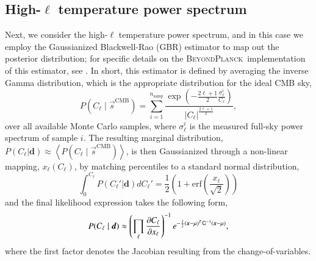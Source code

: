 \documentclass[twocolumn]{aa}
\renewcommand{\d}[0]{\vec{d}}
\newcommand{\red}[0]{\color{red}}
\newcommand{\s}[0]{\vec{s}}
\newcommand{\x}[0]{\vec{x}}
\newcommand{\Cp}[0]{\tens{C}}
\newcommand{\BP}{\textsc{BeyondPlanck}}
\begin{document}
\subsection{High-$\ell$ temperature power spectrum}
\label{sec:highell_spec}

Next, we consider the high-$\ell$ temperature power spectrum, and in
this case we employ the Gaussianized Blackwell-Rao (GBR) estimator
\citep{chu2005,rudjord:2009,planck2016-l05} to map out the posterior
distribution; for specific details on the
\BP\ implementation of this estimator, see \citet{bp12}. In short,
this estimator is defined by averaging the inverse Gamma distribution,
which is the appropriate distribution  for the ideal CMB sky,
\begin{equation}
  P(C_{\ell}\mid\s^{\mathrm{CMB}}) =
  \sum_{i = 1}^{n_{\mathrm{samp}}} \frac{\exp({-\frac{2\ell+1}{2}\frac{\sigma^i_{\ell}}{C_{\ell}}})}{|C_{\ell}|^{\frac{2\ell+1}{2}}},
\end{equation}
over all available Monte Carlo samples, where $\sigma_{\ell}^{i}$ is
the measured full-sky power spectrum of sample $i$. {\red The resulting
marginal distribution, $P(C_\ell | \mathbf{d}) \approx \left<P(C_{\ell}\mid\s^{\mathrm{CMB}})\right>$, is then Gaussianized through a non-linear
mapping, $x_{\ell}(C_{\ell})$, by matching percentiles to a standard
normal distribution,
\begin{equation}
  \int_{0}^{C_\ell} P(C_\ell' | \mathbf{d}) dC_\ell' = \frac{1}{2}\left(1+\textrm{erf}\left(\frac{x_{\ell}}{\sqrt{2}}\right)\right)
\end{equation}
}
and the final likelihood expression takes the
following form,
\begin{equation}
  \label{eq:GBR}
  P(C_\ell\mid\d)\approx \left(\prod_\ell\frac{\partial C_\ell}{\partial x_\ell}\right)^{-1} e^{-\frac{1}{2}(\x-\mu)^T\Cp^{-1}(\x-\mu)},
\end{equation}
where the first factor denotes the Jacobian resulting from the
change-of-variables.
\end{document}
